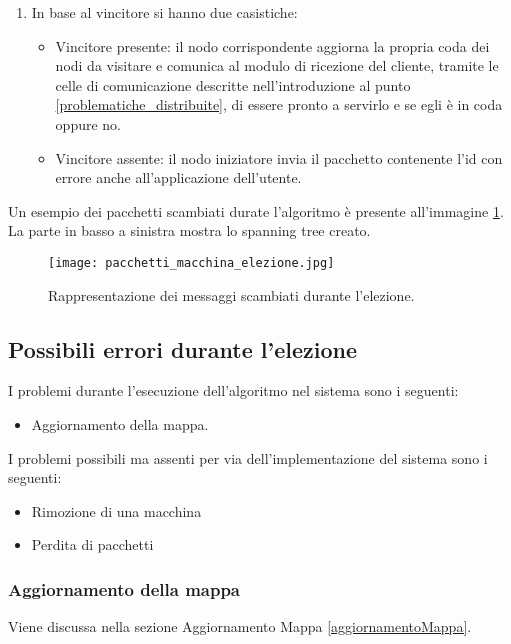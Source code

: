 \begin{enumerate}
	\item In base al vincitore si hanno due casistiche:
		\begin{itemize}
			\item Vincitore presente: il nodo corrispondente aggiorna la propria coda dei nodi da visitare e comunica al modulo di ricezione del cliente, tramite le celle di comunicazione descritte nell'introduzione al punto \ref{problematiche_distribuite}, di essere pronto a servirlo e se egli è in coda oppure no.
			\item Vincitore assente: il nodo iniziatore invia il pacchetto contenente l'id con errore anche all'applicazione dell'utente.
		\end{itemize}
\end{enumerate}

Un esempio dei pacchetti scambiati durate l'algoritmo è presente all'immagine \ref{fig:pacchetti_macchina_elezione}. La parte in basso a sinistra mostra lo spanning tree creato.

\begin{figure}[htbp]
	\centering
	\texttt{[image: pacchetti\_macchina\_elezione.jpg]}
	\caption{Rappresentazione dei messaggi scambiati durante l'elezione.}
	\label{fig:pacchetti_macchina_elezione}
\end{figure}

\newpage

\subsection{Possibili errori durante l'elezione}

I problemi durante l'esecuzione dell'algoritmo nel sistema sono i seguenti:
\begin{itemize}
	\item Aggiornamento della mappa.
\end{itemize}

I problemi possibili ma assenti per via dell'implementazione del sistema sono i seguenti:
\begin{itemize}
	\item Rimozione di una macchina
	\item Perdita di pacchetti
\end{itemize}

\subsubsection{Aggiornamento della mappa}
Viene discussa nella sezione Aggiornamento Mappa \ref{aggiornamentoMappa}.

